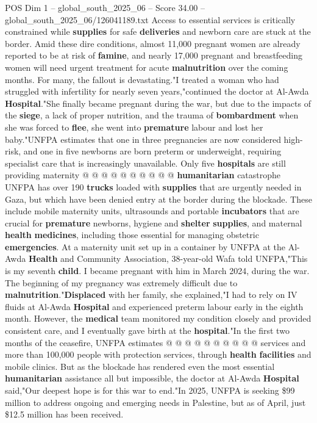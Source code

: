 \begin{textsample}{POS Dim 1 – global\_south\_2025\_06 – Score 34.00 – global\_south\_2025\_06/126041189.txt}
Access to essential services is critically constrained while \textbf{supplies} for safe \textbf{deliveries} and newborn care are stuck at the border.
Amid these dire conditions, almost 11,000 pregnant women are already reported to be at risk of \textbf{famine}, and nearly 17,000 pregnant and breastfeeding women will need urgent treatment for acute \textbf{malnutrition} over the coming months.
For many, the fallout is devastating."I treated a woman who had struggled with infertility for nearly seven years,"continued the doctor at Al-Awda \textbf{Hospital}."She finally became pregnant during the war, but due to the impacts of the \textbf{siege}, a lack of proper nutrition, and the trauma of \textbf{bombardment} when she was forced to \textbf{flee}, she went into \textbf{premature} labour and lost her baby."UNFPA estimates that one in three pregnancies are now considered high-risk, and one in five newborns are born preterm or underweight, requiring specialist care that is increasingly unavailable.
Only five \textbf{hospitals} are still providing maternity @ @ @ @ @ @ @ @ @ @ \textbf{humanitarian} catastrophe UNFPA has over 190 \textbf{trucks} loaded with \textbf{supplies} that are urgently needed in Gaza, but which have been denied entry at the border during the blockade.
These include mobile maternity units, ultrasounds and portable \textbf{incubators} that are crucial for \textbf{premature} newborns, hygiene and \textbf{shelter} \textbf{supplies}, and maternal \textbf{health} \textbf{medicines}, including those essential for managing obstetric \textbf{emergencies}.
At a maternity unit set up in a container by UNFPA at the Al-Awda \textbf{Health} and Community Association, 38-year-old Wafa told UNFPA,"This is my seventh \textbf{child}.
I became pregnant with him in March 2024, during the war.
The beginning of my pregnancy was extremely difficult due to \textbf{malnutrition}."\textbf{Displaced} with her family, she explained,"I had to rely on IV fluids at Al-Awda \textbf{Hospital} and experienced preterm labour early in the eighth month.
However, the \textbf{medical} team monitored my condition closely and provided consistent care, and I eventually gave birth at the \textbf{hospital}."In the first two months of the ceasefire, UNFPA estimates @ @ @ @ @ @ @ @ @ @ services and more than 100,000 people with protection services, through \textbf{health} \textbf{facilities} and mobile clinics.
But as the blockade has rendered even the most essential \textbf{humanitarian} assistance all but impossible, the doctor at Al-Awda \textbf{Hospital} said,"Our deepest hope is for this war to end."In 2025, UNFPA is seeking \$99 million to address ongoing and emerging needs in Palestine, but as of April, just \$12.5 million has been received.

\end{textsample}
